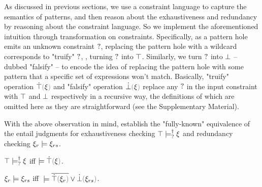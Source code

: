 As discussed in previous sections, we use a constraint language to capture the semantics of patterns, and then reason about the exhaustiveness and redundancy by reasoning about the constraint language. So we implement the aforementioned intuition through transformation on constraints. Specifically, as a pattern hole emits an unknown constraint $\mathtt{?}$, replacing the pattern hole with a wildcard corresponds to "truify" $\mathtt{?}$, \ie, turning $\mathtt{?}$ into $\top$. Similarly, we turn $\mathtt{?}$ into $\bot$ -- dubbed "falsify" -- to encode the idea of replacing the pattern hole with some pattern that a specific set of expressions won't match. Basically, "truify" operation $\ctruify{\xi}$ and "falsify" operation $\cfalsify{\xi}$ replace any $\mathtt{?}$ in the input constraint with $\top$ and $\bot$ respectively in a recursive way, the definitions of which are omitted here as they are straightforward (see the Supplementary Material).

% 


With the above observation in mind,  establish the "fully-known" equivalence of the entail judgments for exhaustiveness checking $\top \models_{?}^{\dag} \xi$ and redundancy checking $\xi_r \models \xi_{rs}$.

\begin{theorem}
\label{theorem:exhaustive-truify}
  $\top \models_{?}^{\dag} \xi$ iff $\ccsatisfy{}{\ctruify{\xi}}$.
\end{theorem}

\begin{theorem}
\label{theorem:redundant-truify-falsify}
  $\xi_r \models \xi_{rs}$ iff $\ccsatisfy{\;}{\cor{\cdual{\ctruify{\xi_r}}}{\cfalsify{\xi_{rs}}}}$.
\end{theorem}



